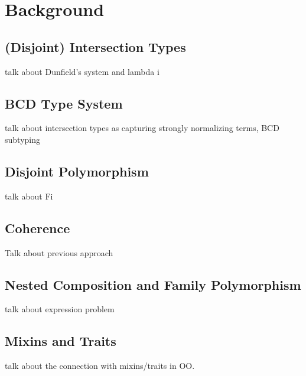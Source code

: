 
\chapter{Background}



\section{(Disjoint) Intersection Types}
\label{bg:sec:intersection}

talk about Dunfield's system and lambda i

\section{BCD Type System}

talk about intersection types as capturing  strongly normalizing terms, BCD subtyping

\section{Disjoint Polymorphism}

talk about Fi

\section{Coherence}

Talk about previous approach


\section{Nested Composition and Family Polymorphism}


talk about expression problem

\section{Mixins and Traits}

talk about the connection with mixins/traits in OO.



